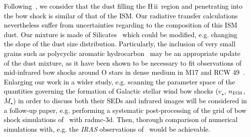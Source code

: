 \documentclass[useAMS,usenatbib]{mn2e}
\newcommand\hii{H\,{\sc ii} \,}
\newcommand{\degree}{\ensuremath{^\circ}}
\begin{document}
\textcolor{black}{ 
Following~\citet{pavlyuchenkov_rep_57_2013}, we consider that the dust filling 
the \hii region and penetrating into the bow shock is similar of that of the 
ISM. Our radiative transfer calculations nevertheless suffer from uncertainties 
regarding to the composition of this ISM dust. Our mixture is made of 
Silicates~\citep{draine_apj_285_1984} which could be modified, e.g. changing the slope 
of the dust size distribution. Particularly, the inclusion of very small grains such as polycyclic 
aromatic hydrocarbon~\citep[PAHs, see][]{wood_apj_688_2008} may be an 
appropriate update of the dust mixture, as it have been shown to be necessary 
to fit observations of mid-infrared bow shocks around O stars in dense medium in 
M17 and RCW 49~\citep{povich_apj_689_2008}. Enlarging our work in a wider study, 
e.g. scanning the parameter space of the quantities governing the formation of 
Galactic stellar wind bow shocks ($v_{\star}$, $n_{\rm ISM}$, $M_{\star}$) in 
order to discuss both their SEDs and infrared images will be considered in a 
follow-up paper, e.g. performing a systematic post-processing of the grid of bow 
shock simulations of~\citet{meyer_mnras_459_2016} with {\sc radmc-3d}. Then, 
thorough comparison of numerical simulations with, e.g. the {\it IRAS} 
observations 
of~\citet{buren_apj_329_1988,vanburen_aj_110_1995,noriegacrespo_aj_113_1997}  
would be achievable.  
}


\end{document}
